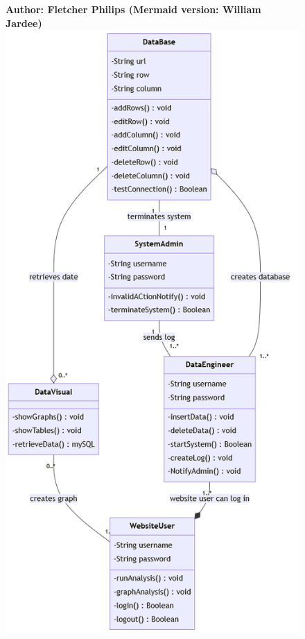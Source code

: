\documentclass[11pt]{article}
\begin{document}
\begin{figure}[!ht]
\centering
\textbf{Author: Fletcher Philips (Mermaid version: William Jardee)}
	\includegraphics[height=0.6\paperheight]{./Class Diagrams/ColdCaseClassDiagram_mermaid.png}\\

\end{figure}
\end{document}

